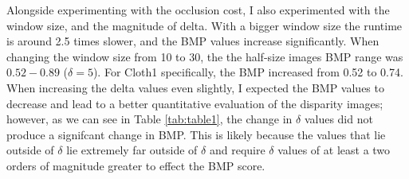 \documentclass[11pt,a4paper]{article}
\begin{document}
Alongside experimenting with the occlusion cost, I also experimented with the window size, and the magnitude of delta.
 With a bigger window size the runtime is around 2.5 times slower, and the BMP values increase significantly. When changing the
window size from 10 to 30, the the half-size images BMP range was $0.52-0.89$ ($\delta = 5$). For Cloth1 specifically, the BMP increased from 0.52 to 0.74. 
 When increasing the delta values even slightly, I expected the BMP values to decrease and lead to a better quantitative evaluation of the disparity images; however, as we can see in Table 
 \ref{tab:table1}, the change in $\delta$ values did not produce a signifcant change in BMP.  This is likely because the values 
 that lie outside of $\delta$ lie extremely far outside of $\delta$ and require $\delta$ values of at least a two orders of magnitude
 greater to effect the BMP score.

\printbibliography
\end{document}
